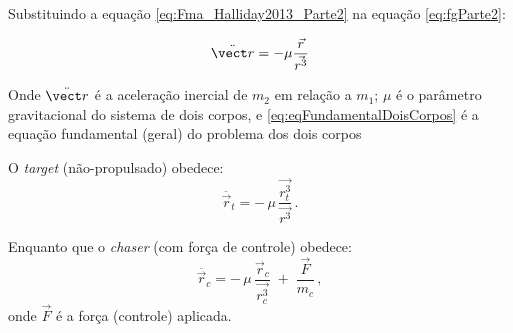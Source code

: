 Substituindo a equação \eqref{eq:Fma_Halliday2013_Parte2} na equação \eqref{eq:fgParte2}:

\begin{equation}
\label{eq:eqFundamentalDoisCorpos}
\ddot {\vect r} = -\mu \frac{\vec r}{\vec {r^3}}
\end{equation}

Onde $\ddot{\vect r}$ é a aceleração inercial de $m_2$ em relação a $m_1$; $\mu$ é o parâmetro gravitacional do sistema de dois corpos, e \eqref{eq:eqFundamentalDoisCorpos} é a equação fundamental (geral) do problema dos dois corpos \cite{fehse2003,wie2008space}





O \emph{target} (não-propulsado) obedece:
\begin{equation}
\label{eq:movimentoTarget}
\ddot{\vec r_t} = -\,\mu\,\frac{\vec {r_t^3}}{\vec {r^3}}\,.
\end{equation}

Enquanto que o \emph{chaser} (com força de controle) obedece:
\begin{equation}
\label{eq:movimentoChaser}
\ddot{\vec r_c} = -\,\mu\,\frac{\vec r_c}{\vec {r_c^3}} \;+\; \frac{\vec F}{m_c}\,,
\end{equation}
onde \(\vec F\) é a força (controle) aplicada.
